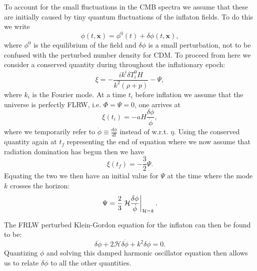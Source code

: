 \documentclass[%
reprint,
 amsmath,amssymb,
 aps,
]{revtex4-2}
\newcommand{\Hp}{\mathcal{H}}
\begin{document}
To account for the small fluctuations in the CMB spectra we assume that these are initially caused by tiny quantum fluctuations of the inflaton fields. To do this we write
\[\phi(t,\textbf{x})=\phi^0(t)+\delta\phi(t,\textbf{x}),\]
where $\phi^0$ is the equilibrium of the field and $\delta\phi$ is a small perturbation, not to be confused with the perturbed number density for CDM. To proceed from here we consider a conserved quantity during throughout the inflationary epoch:
\begin{equation}
	\xi=-\frac{ik^i\delta T_i^0H}{k^2(\rho+p)}-\Psi,
	\label{eq:xi}
\end{equation}
where $k_i$ is the Fourier mode. At a time $t_i$ before inflation we assume that the universe is perfectly FLRW, i.e. $\Phi=\Psi=0$, one arrives at
\[\xi(t_i)=-aH\frac{\delta\phi}{\dot\phi},\]
where we temporarily refer to $\dot\phi\equiv\frac{d\phi}{dt}$ instead of w.r.t. $\eta$. Using the conserved quantity again at $t_f$ representing the end of equation where we now assume that radiation domination has begun then we have
\[\xi(t_f)=-\frac{3}{2}\Psi.\]
Equating the two we then have an initial value for $\Psi$ at the time where the mode $k$ crosses the horizon:
\begin{equation}
	\Psi=\frac{2}{3}\eval{\Hp\frac{\delta\phi}{\dot\phi}}_{\Hp=k}.
	\label{Psi_infl}
\end{equation}

The FRLW perturbed Klein-Gordon equation for the inflaton can then be found to be:
\[\delta\ddot\phi+2\Hp\delta\dot\phi+k^2\delta\phi=0.\]
Quantizing $\phi$ and solving this damped harmonic oscillator equation then allows us to relate $\delta\phi$ to all the other quantities. 
\end{document}
